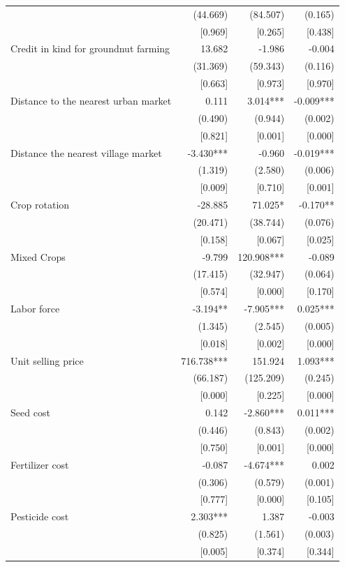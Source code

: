 \documentclass[
]{article}
\begin{document}
\begin{landscape}
\begin{ThreePartTable}
\begin{longtable}[t]{lrrr}
 & (44.669) & (84.507) & (0.165)\\
 & {}[0.969] & {}[0.265] & {}[0.438]\\
Credit in kind for groundnut farming & 13.682 & -1.986 & -0.004\\
 & (31.369) & (59.343) & (0.116)\\
 & {}[0.663] & {}[0.973] & {}[0.970]\\
Distance to the nearest urban market & 0.111 & 3.014*** & -0.009***\\
 & (0.490) & (0.944) & (0.002)\\
 & {}[0.821] & {}[0.001] & {}[0.000]\\
Distance the nearest village market & -3.430*** & -0.960 & -0.019***\\
 & (1.319) & (2.580) & (0.006)\\
 & {}[0.009] & {}[0.710] & {}[0.001]\\
Crop rotation & -28.885 & 71.025* & -0.170**\\
 & (20.471) & (38.744) & (0.076)\\
 & {}[0.158] & {}[0.067] & {}[0.025]\\
Mixed Crops & -9.799 & 120.908*** & -0.089\\
 & (17.415) & (32.947) & (0.064)\\
 & {}[0.574] & {}[0.000] & {}[0.170]\\
Labor force & -3.194** & -7.905*** & 0.025***\\
 & (1.345) & (2.545) & (0.005)\\
 & {}[0.018] & {}[0.002] & {}[0.000]\\
Unit selling price & 716.738*** & 151.924 & 1.093***\\
 & (66.187) & (125.209) & (0.245)\\
 & {}[0.000] & {}[0.225] & {}[0.000]\\
Seed cost & 0.142 & -2.860*** & 0.011***\\
 & (0.446) & (0.843) & (0.002)\\
 & {}[0.750] & {}[0.001] & {}[0.000]\\
Fertilizer cost & -0.087 & -4.674*** & 0.002\\
 & (0.306) & (0.579) & (0.001)\\
 & {}[0.777] & {}[0.000] & {}[0.105]\\
Pesticide cost & 2.303*** & 1.387 & -0.003\\
 & (0.825) & (1.561) & (0.003)\\
 & {}[0.005] & {}[0.374] & {}[0.344]\\

\end{longtable}
\end{ThreePartTable}
\end{landscape}
\end{document}
